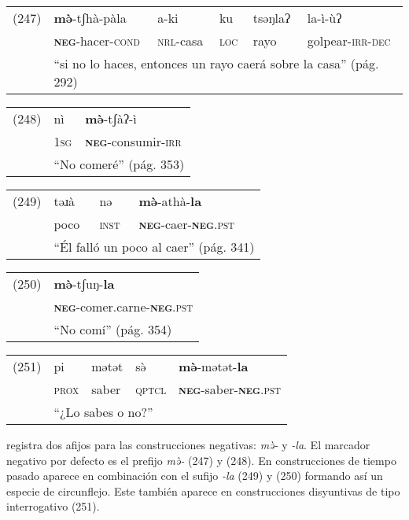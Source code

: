 {\setmainfont{Charis SIL} 

\begin{tabular}{llllll}
(247) & \textbf{mə̀}-tʃhà-pàla & a-ki & ku & tsəŋlaʔ & la-ì-ùʔ \\
& \textsc{\textbf{neg}-}hacer-\textsc{cond} & \textsc{nrl-}casa & \textsc{loc} & rayo & golpear-\textsc{irr-dec} \\
& \multicolumn{5}{l}{``si no lo haces, entonces un rayo caerá sobre la casa'' (pág. 292)}
\end{tabular} \vspace{0.5cm}

\begin{tabular}{lll}
(248) & nì & \textbf{mə̀}-tʃàʔ-ì \\
& \textsc{1sg} & \textsc{\textbf{neg}}-consumir-\textsc{irr} \\
& \multicolumn{2}{l}{``No comeré'' (pág. 353)}
\end{tabular} \vspace{0.5cm}

\begin{tabular}{llll}
(249) & təɹà & nə & \textbf{mə̀}-athà-\textbf{la} \\
& poco & \textsc{inst} & \textsc{\textbf{neg}}-caer-\textsc{\textbf{neg}.pst} \\
& \multicolumn{3}{l}{``Él falló un poco al caer'' (pág. 341)}
\end{tabular} \vspace{0.5cm}

\begin{tabular}{ll}
(250) & \textbf{mə̀}-tʃuŋ-\textbf{la} \\
& \textsc{\textbf{neg}}-comer.carne-\textsc{\textbf{neg}.pst} \\
& ``No comí'' (pág. 354)
\end{tabular} \vspace{0.5cm}

\begin{tabular}{lllll}
(251) & pi & mətət & sə̀ & \textbf{mə̀}-mətət-\textbf{la} \\
& \textsc{prox} & saber & \textsc{qptcl} & \textsc{\textbf{neg}}-saber-\textsc{\textbf{neg}.pst} \\
& \multicolumn{4}{l}{``¿Lo sabes o no?''} (pág. 342)
\end{tabular} \vspace{0.5cm}

}

\textcolor{MidnightBlue}{\citet{Coupe}} registra dos afijos para las construcciones negativas: {\setmainfont{Charis SIL} \textit{mə̀-}} y {\setmainfont{Charis SIL} \textit{-la}}. El marcador negativo por defecto es el prefijo {\setmainfont{Charis SIL} \textit{mə̀-}} (247) y (248). En construcciones de tiempo pasado aparece en combinación con el sufijo {\setmainfont{Charis SIL} \textit{-la}} (249) y (250) formando así un especie de circunflejo. Este también aparece en construcciones disyuntivas de tipo interrogativo (251).
